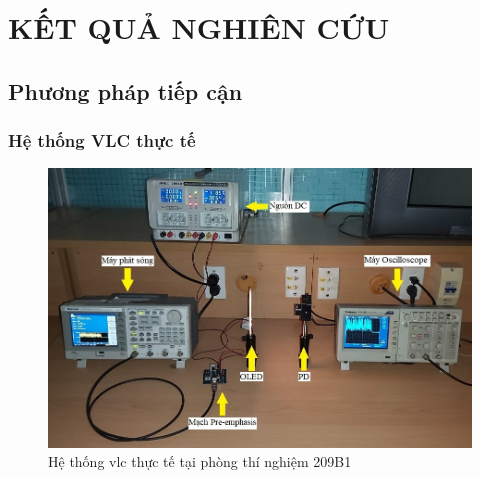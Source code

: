 \chapter{KẾT QUẢ NGHIÊN CỨU} \label{sec:chapter_3}
\section{Phương pháp tiếp cận}
\subsection{Hệ thống VLC thực tế}
\begin{figure} [ht]
\centering
\captionsetup{justification=centering}
\includegraphics [scale=0.6] {Image/VLC_thucte}
\caption{Hệ thống \ac{vlc} thực tế tại phòng thí nghiệm 209B1}
\end{figure}
